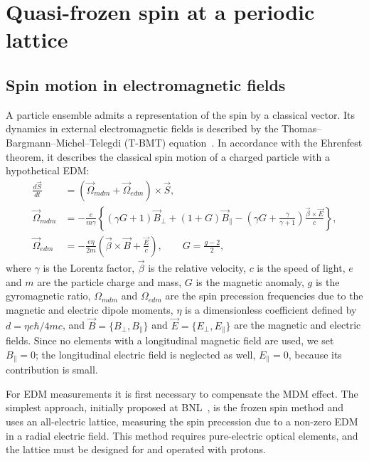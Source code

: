 \section{Quasi-frozen spin at a periodic lattice}
\label{sec:qfs}

\subsection{Spin motion in electromagnetic fields}

A particle ensemble admits a representation of the spin by a classical vector.
Its dynamics in external electromagnetic fields is described by the
Thomas--Bargmann--Michel--Telegdi (T-BMT)
equation~\cite{Bargmann:1959gz,Fukuyama:2013ioa}. In accordance with the
Ehrenfest theorem, it describes the classical spin motion of a charged particle
with a hypothetical EDM:
\begin{equation}
\begin{aligned}
  \frac{d\vec{S}}{dt} &= \left(\vec{\Omega}_{mdm} + \vec{\Omega}_{edm}\right)\times\vec{S},\\
  \vec{\Omega}_{mdm} &= -\frac{e}{m\gamma}\left\{(\gamma G+1)\vec{B}_{\perp}
     + (1+G)\vec{B}_{\parallel}
     - \left(\gamma G+\frac{\gamma}{\gamma+1}\right)\frac{\vec{\beta}\times\vec{E}}{c}\right\},\\
  \vec{\Omega}_{edm} &= -\frac{e\eta}{2m}\left(\vec{\beta}\times\vec{B}+\frac{\vec{E}}{c}\right),
  \qquad G = \frac{g-2}{2},
\end{aligned}
\label{eq:tbmt}
\end{equation}
where $\gamma$ is the Lorentz factor, $\vec{\beta}$ is the relative velocity,
$c$ is the speed of light, $e$ and $m$ are the particle charge and mass, $G$ is
the magnetic anomaly, $g$ is the gyromagnetic ratio, $\Omega_{mdm}$ and
$\Omega_{edm}$ are the spin precession frequencies due to the magnetic and
electric dipole moments, $\eta$ is a dimensionless coefficient defined by
$d = \eta e\hbar/4mc$, and $\vec{B}=\{B_\perp, B_\parallel\}$ and
$\vec{E}=\{E_\perp, E_\parallel\}$ are the magnetic and electric fields. Since
no elements with a longitudinal magnetic field are used, we set
$B_\parallel = 0$; the longitudinal electric field is neglected as well,
$E_\parallel = 0$, because its contribution is small.

For EDM measurements it is first necessary to compensate the MDM effect. The
simplest approach, initially proposed at BNL~\cite{srEDM:2008_deuteron_proposal}, is the frozen
spin method and uses an all-electric lattice, measuring the spin precession due
to a non-zero EDM in a radial electric field. This method requires
pure-electric optical elements, and the lattice must be designed for and
operated with protons.

